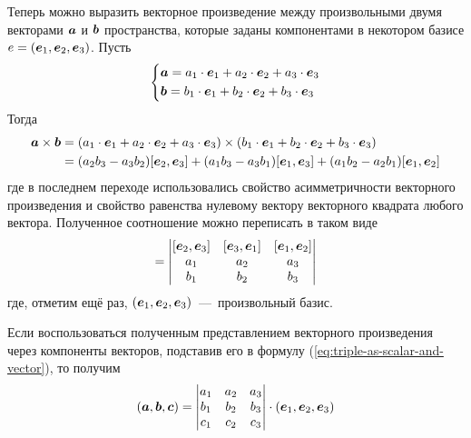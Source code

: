 \documentclass[a4paper,12pt]{article}
\begin{document}
  Теперь можно выразить векторное произведение между произвольными двумя векторами $\boldsymbol a$ и $\boldsymbol b$ пространства, которые заданы компонентами в некотором базисе $e \hm= (\bds e_1, \bds e_2, \bds e_3)$.
  Пусть
  \[
    \left\{
      \begin{aligned}
        &\boldsymbol a = a_1 \cdot \boldsymbol e_1 + a_2 \cdot \boldsymbol e_2 + a_3 \cdot \boldsymbol e_3\\
        &\boldsymbol b = b_1 \cdot \boldsymbol e_1 + b_2 \cdot \boldsymbol e_2 + b_3 \cdot \boldsymbol e_3
      \end{aligned}
    \right.
  \]
  Тогда  %
  \begin{equation*}
  \begin{split}
    \boldsymbol a \times \boldsymbol b
    =\; &(a_1 \cdot \boldsymbol e_1 + a_2 \cdot \boldsymbol e_2 + a_3 \cdot \boldsymbol e_3) \times (b_1 \cdot \boldsymbol e_1 + b_2 \cdot \boldsymbol e_2 + b_3 \cdot \boldsymbol e_3)\\
    =\; &(a_2 b_3 - a_3 b_2)[\boldsymbol e_2, \boldsymbol e_3] + (a_1 b_3 - a_3 b_1)[\boldsymbol e_1, \boldsymbol e_3] + (a_1 b_2 - a_2 b_1)[\boldsymbol e_1, \boldsymbol e_2]
  \end{split}
  \end{equation*}
  где в последнем переходе использовались свойство асимметричности векторного произведения и свойство равенства нулевому вектору векторного квадрата любого вектора.
  Полученное соотношение можно переписать в таком виде
  \begin{equation}
    [\bds a, \bds b] = \begin{vmatrix}
      [\bds e_2, \bds e_3] & [\bds e_3, \bds e_1] & [\bds e_1, \bds e_2]\\
      a_1 & a_2 & a_3\\
      b_1 & b_2 & b_3
    \end{vmatrix}
  \end{equation}
  где, отметим ещё раз, $(\boldsymbol e_1, \boldsymbol e_2, \boldsymbol e_3)$~---~произвольный базис.
  
  Если воспользоваться полученным представлением векторного произведения через компоненты векторов, подставив его в формулу (\ref{eq:triple-as-scalar-and-vector}), то получим %
  \begin{equation}
    (\boldsymbol a, \boldsymbol b, \boldsymbol c) = \begin{vmatrix}
      a_1 & a_2 & a_3\\
      b_1 & b_2 & b_3\\
      c_1 & c_2 & c_3
    \end{vmatrix} \cdot (\boldsymbol e_1, \boldsymbol e_2, \boldsymbol e_3)
  \end{equation}
\end{document}
